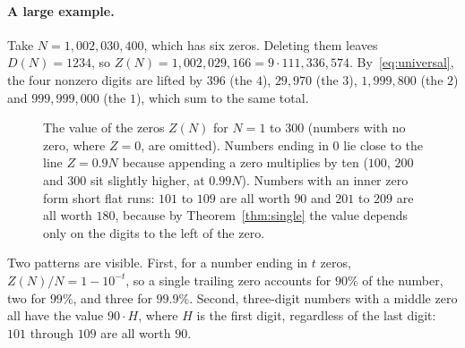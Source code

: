 \documentclass[11pt,a4paper]{article}
\theoremstyle{definition}
\newcommand{\Dz}{D}   %
\newcommand{\Zv}{Z}   %
\begin{document}
\paragraph{A large example.} Take $N=1{,}002{,}030{,}400$, which has six zeros. Deleting them leaves $\Dz(N)=1234$, so $\Zv(N)=1{,}002{,}029{,}166=9\cdot 111{,}336{,}574$. By~\eqref{eq:universal}, the four nonzero digits are lifted by $396$ (the $4$), $29{,}970$ (the $3$), $1{,}999{,}800$ (the $2$) and $999{,}999{,}000$ (the $1$), which sum to the same total.

\begin{figure}[ht]
\centering
{}
\caption{The value of the zeros $\Zv(N)$ for $N=1$ to $300$ (numbers with no zero, where $\Zv=0$, are omitted). Numbers ending in $0$ lie close to the line $\Zv=0.9N$ because appending a zero multiplies by ten ($100$, $200$ and $300$ sit slightly higher, at $0.99N$). Numbers with an inner zero form short flat runs: $101$ to $109$ are all worth $90$ and $201$ to $209$ are all worth $180$, because by Theorem~\ref{thm:single} the value depends only on the digits to the left of the zero.}
\label{fig:plot}
\end{figure}

Two patterns are visible. First, for a number ending in $t$ zeros, $\Zv(N)/N=1-10^{-t}$, so a single trailing zero accounts for $90\%$ of the number, two for $99\%$, and three for $99.9\%$. Second, three-digit numbers with a middle zero all have the value $90\cdot H$, where $H$ is the first digit, regardless of the last digit: $101$ through $109$ are all worth $90$.
\end{document}
